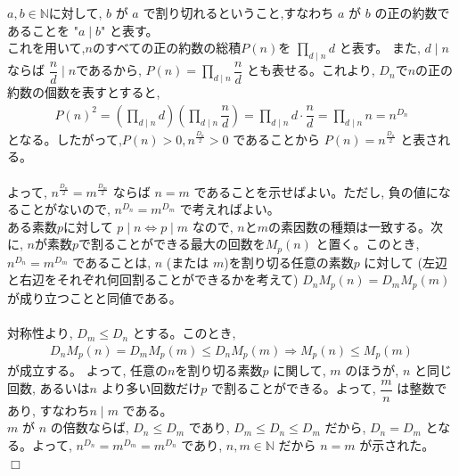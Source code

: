 $a,b\in\mathbb{N}$に対して, $b$ が $a$ で割り切れるということ,すなわち $a$ が $b$ の正の約数であることを "$a\mid b$" と表す。\\
これを用いて,$n$のすべての正の約数の総積$P(n)$を $\displaystyle\prod_{d\mid n}d$ と表す。 また, $d\mid n$ならば $\dfrac{n}{d}\mid n$であるから, $P(n)=\displaystyle\prod_{d\mid n}\dfrac{n}{d}$ とも表せる。これより, $D_n$で$n$の正の約数の個数を表すとすると,
\begin{eqnarray*}
P(n)^2 = \left(\displaystyle\prod_{d\mid n}d\right)\left(\displaystyle\prod_{d\mid n}\dfrac{n}{d}\right) = \displaystyle\prod_{d\mid n}d\cdot \dfrac{n}{d} = \displaystyle\prod_{d\mid n}n = n^{D_n}
\end{eqnarray*}
となる。したがって,$P(n)>0, n^{\frac{D_n}{2}}>0$ であることから $P(n)=n^{\frac{D_n}{2}}$ と表される。\\
\\
よって, $n^{\frac{D_n}{2}}=m^{\frac{D_m}{2}}$ ならば $n=m$ であることを示せばよい。ただし, 負の値になることがないので, $n^{D_n}=m^{D_m}$ で考えればよい。\\
ある素数$p$に対して $p\mid n\iff p\mid m$ なので, $n$と$m$の素因数の種類は一致する。次に, $n$が素数$p$で割ることができる最大の回数を$M_p(n)$ と置く。このとき, $n^{D_n}=m^{D_m}$ であることは, $n$ (または $m$)を割り切る任意の素数$p$ に対して (左辺と右辺をそれぞれ何回割ることができるかを考えて) $D_nM_p(n)=D_mM_p(m)$ が成り立つことと同値である。\\
\\
対称性より, $D_m\le D_n$ とする。このとき,
\begin{eqnarray*}
D_nM_p(n)=D_mM_p(m)\le D_nM_p(m) \Rightarrow M_p(n)\le M_p(m)
\end{eqnarray*}
が成立する。 よって, 任意の$n$を割り切る素数$p$ に関して, $m$ のほうが, $n$ と同じ回数, あるいは$n$ より多い回数だけ$p$ で割ることができる。よって, $\dfrac{m}{n}$ は整数であり, すなわち$n\mid m$ である。\\
$m$ が $n$ の倍数ならば,  $D_n\le D_m$ であり, $D_m\le D_n\le D_m$ だから, $D_n=D_m$ となる。よって, $n^{D_n}=m^{D_m}=m^{D_n}$ であり, $n,m\in\mathbb{N}$ だから $n=m$ が示された。　　$\Box$

